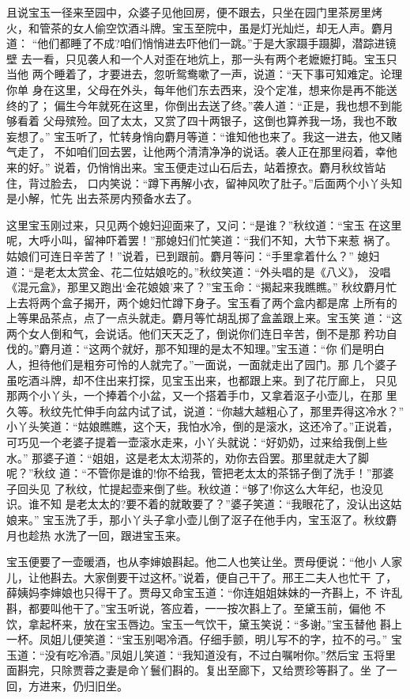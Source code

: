 且说宝玉一径来至园中，众婆子见他回房，便不跟去，只坐在园门里茶房里烤
火，和管茶的女人偷空饮酒斗牌。宝玉至院中，虽是灯光灿烂，却无人声。麝月道：
“他们都睡了不成?咱们悄悄进去吓他们一跳。”于是大家蹑手蹑脚，潜踪进镜壁
去一看，只见袭人和一个人对歪在地炕上，那一头有两个老嬷嬷打盹。宝玉只当他
两个睡着了，才要进去，忽听鸳鸯嗽了一声，说道：“天下事可知难定。论理你单
身在这里，父母在外头，每年他们东去西来，没个定准，想来你是再不能送终的了；
偏生今年就死在这里，你倒出去送了终。”袭人道：“正是，我也想不到能够看着
父母殡殓。回了太太，又赏了四十两银子，这倒也算养我一场，我也不敢妄想了。”
宝玉听了，忙转身悄向麝月等道：“谁知他也来了。我这一进去，他又赌气走了，
不如咱们回去罢，让他两个清清净净的说话。袭人正在那里闷着，幸他来的好。”
说着，仍悄悄出来。宝玉便走过山石后去，站着撩衣。麝月秋纹皆站住，背过脸去，
口内笑说：“蹲下再解小衣，留神风吹了肚子。”后面两个小丫头知是小解，忙先
出去茶房内预备水去了。

这里宝玉刚过来，只见两个媳妇迎面来了，又问：“是谁？”秋纹道：“宝玉
在这里呢，大呼小叫，留神吓着罢！”那媳妇们忙笑道：“我们不知，大节下来惹
祸了。姑娘们可连日辛苦了！”说着，已到跟前。麝月等问：“手里拿着什么？”
媳妇道：“是老太太赏金、花二位姑娘吃的。”秋纹笑道：“外头唱的是《八义》，
没唱《混元盒》，那里又跑出‘金花娘娘’来了？”宝玉命：“揭起来我瞧瞧。”
秋纹麝月忙上去将两个盒子揭开，两个媳妇忙蹲下身子。宝玉看了两个盒内都是席
上所有的上等果品茶点，点了一点头就走。麝月等忙胡乱掷了盒盖跟上来。宝玉笑
道：“这两个女人倒和气，会说话。他们天天乏了，倒说你们连日辛苦，倒不是那
矜功自伐的。”麝月道：“这两个就好，那不知理的是太不知理。”宝玉道：“你
们是明白人，担待他们是粗夯可怜的人就完了。”一面说，一面就走出了园门。那
几个婆子虽吃酒斗牌，却不住出来打探，见宝玉出来，也都跟上来。到了花厅廊上，
只见那两个小丫头，一个捧着个小盆，又一个搭着手巾，又拿着沤子小壶儿，在那
里久等。秋纹先忙伸手向盆内试了试，说道：“你越大越粗心了，那里弄得这冷水？”
小丫头笑道：“姑娘瞧瞧，这个天，我怕水冷，倒的是滚水，这还冷了。”正说着，
可巧见一个老婆子提着一壶滚水走来，小丫头就说：“好奶奶，过来给我倒上些水。”
那婆子道：“姐姐，这是老太太沏茶的，劝你去舀罢。那里就走大了脚呢？”秋纹
道：“不管你是谁的!你不给我，管把老太太的茶铞子倒了洗手！”那婆子回头见
了秋纹，忙提起壶来倒了些。秋纹道：“够了!你这么大年纪，也没见识。谁不知
是老太太的?要不着的就敢要了？”婆子笑道：“我眼花了，没认出这姑娘来。”
宝玉洗了手，那小丫头子拿小壶儿倒了沤子在他手内，宝玉沤了。秋纹麝月也趁热
水洗了一回，跟进宝玉来。

宝玉便要了一壶暖酒，也从李婶娘斟起。他二人也笑让坐。贾母便说：“他小
人家儿，让他斟去。大家倒要干过这杯。”说着，便自己干了。邢王二夫人也忙干
了，薛姨妈李婶娘也只得干了。贾母又命宝玉道：“你连姐姐妹妹的一齐斟上，不
许乱斟，都要叫他干了。”宝玉听说，答应着，一一按次斟上了。至黛玉前，偏他
不饮，拿起杯来，放在宝玉唇边。宝玉一气饮干，黛玉笑说：“多谢。”宝玉替他
斟上一杯。凤姐儿便笑道：“宝玉别喝冷酒。仔细手颤，明儿写不的字，拉不的弓。”
宝玉道：“没有吃冷酒。”凤姐儿笑道：“我知道没有，不过白嘱咐你。”然后宝
玉将里面斟完，只除贾蓉之妻是命丫鬟们斟的。复出至廊下，又给贾珍等斟了。坐
了一回，方进来，仍归旧坐。

